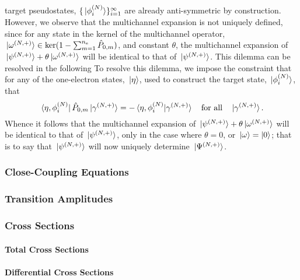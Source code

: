 \documentclass[draft]{article}
\begin{document}
target pseudostates, $\lbrace\ket*{\phi_{i}^{(N)}}\rbrace_{i = 1}^{\infty}$ are
already anti-symmetric by construction.
However, we observe that the multichannel expansion is not uniquely defined,
since for any state in the kernel of the multichannel operator,
$\ket*{\omega^{(N, +)}} \in
\ker(1 - \sum_{m = 1}^{n_{\mathrm{e}}}\hat{P}_{0, m})$,
and constant $\theta$, the multichannel expansion of
$\ket*{\psi^{(N, +)}} + \theta\ket*{\omega^{(N, +)}}$ will be identical to
that of $\ket*{\psi^{(N, +)}}$.
This dilemma can be resolved in the following
To resolve this dilemma, we impose the constraint that for any of the
one-electron states, $\ket*{\eta}$, used to construct the target state,
$\ket*{\phi_{i}^{(N)}}$, that
\begin{equation}
  \label{eq:multichannel-constraint}
  \bra*{\eta, \phi_{i}^{\lr{N}}}
  \hat{P}_{0, m}
  \ket*{\gamma^{\lr{N, +}}}
  =
  -
  \bra*{\eta, \phi_{i}^{\lr{N}}}
  \ket*{\gamma^{\lr{N, +}}}
  \qq{for all}
  \ket*{\gamma^{\lr{N, +}}}
  .
\end{equation}
Whence it follows that the multichannel expansion of
$\ket*{\psi^{(N, +)}} + \theta\ket*{\omega^{(N, +)}}$ will be identical to
that of $\ket*{\psi^{(N, +)}}$, only in the case where $\theta = 0$, or
$\ket*{\omega} = \ket{0}$; that is to say that $\ket*{\psi^{(N, +)}}$ will
now uniquely determine $\ket*{\Psi^{(N, +)}}$.

\subsubsection{Close-Coupling Equations}
\label{sec:cc-equations}

\subsubsection{Transition Amplitudes}
\label{sec:transition-amplitudes}

\subsubsection{Cross Sections}
\label{sec:cross-sections}

\paragraph{Total Cross Sections}
\label{sec:cc-total-cross-sections}

\paragraph{Differential Cross Sections}
\label{sec:cc-differential-cross-sections}
\end{document}
